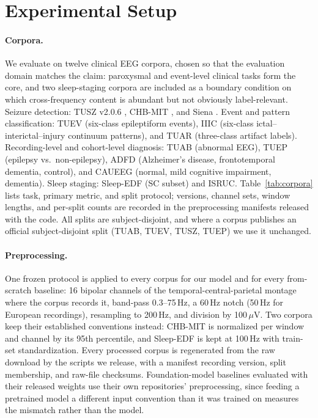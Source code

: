 \section{Experimental Setup}
\label{sec:setup}

\paragraph{Corpora.}
We evaluate on twelve clinical EEG corpora, chosen so that the evaluation
domain matches the claim: paroxysmal and event-level clinical tasks form the
core, and two sleep-staging corpora are included as a boundary condition on
which cross-frequency content is abundant but not obviously label-relevant.
Seizure detection: TUSZ v2.0.6 \citep{shah2018temple}, CHB-MIT
\citep{shoeb2009application}, and Siena \citep{detti2020eeg}. Event and pattern
classification: TUEV (six-class epileptiform events), IIIC (six-class ictal--
interictal--injury continuum patterns), and TUAR (three-class artifact
labels). Recording-level and cohort-level diagnosis: TUAB (abnormal EEG),
TUEP (epilepsy vs.\ non-epilepsy), ADFD (Alzheimer's disease, frontotemporal
dementia, control), and CAUEEG (normal, mild cognitive impairment,
dementia). Sleep staging: Sleep-EDF (SC subset) and ISRUC. Table~\ref{tab:corpora}
lists task, primary metric, and split protocol; versions, channel sets,
window lengths, and per-split counts are recorded in the preprocessing
manifests released with the code. All splits are
subject-disjoint, and where a corpus publishes an official subject-disjoint
split (TUAB, TUEV, TUSZ, TUEP) we use it unchanged.

\paragraph{Preprocessing.}
One frozen protocol is applied to every corpus for our model and for every
from-scratch baseline: 16 bipolar channels of the temporal-central-parietal
montage where the corpus records it, band-pass 0.3--75\,Hz, a 60\,Hz notch
(50\,Hz for European recordings), resampling to 200\,Hz, and division by
100\,$\mu$V. Two corpora keep their established conventions instead:
CHB-MIT is normalized per window and channel by its 95th percentile, and
Sleep-EDF is kept at 100\,Hz with train-set standardization. Every processed
corpus is regenerated from the raw download by the scripts we release, with
a manifest recording version, split membership, and raw-file checksums.
Foundation-model baselines evaluated with their released weights use their
own repositories' preprocessing, since feeding a pretrained model a
different input convention than it was trained on measures the mismatch
rather than the model.

